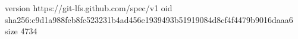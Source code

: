 version https://git-lfs.github.com/spec/v1
oid sha256:c9d1a988feb8fc523231b4ad456e1939493b51919084d8cf4f4479b9016daaa6
size 4734
